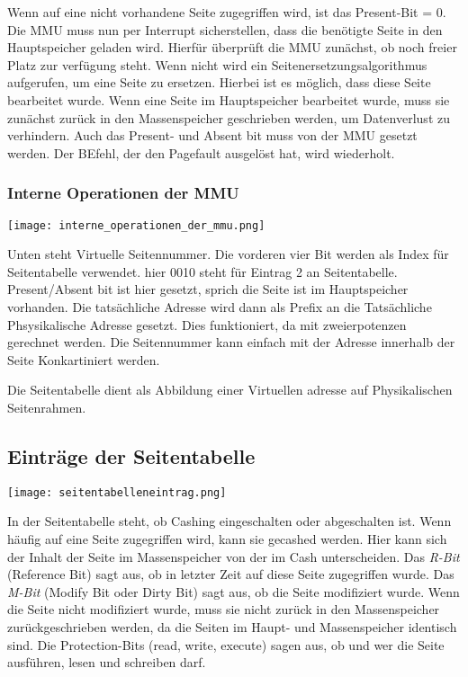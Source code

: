 Wenn auf eine nicht vorhandene Seite zugegriffen wird, ist das Present-Bit = 0. Die MMU muss nun per Interrupt sicherstellen, dass die benötigte Seite in den Hauptspeicher geladen wird. Hierfür überprüft die MMU zunächst, ob noch freier Platz zur verfügung steht. Wenn nicht wird ein Seitenersetz\-ungsalgorithmus aufgerufen, um eine Seite zu ersetzen. Hierbei ist es möglich, dass diese Seite bearbeitet wurde. Wenn eine Seite im Hauptspeicher bearbeitet wurde, muss sie zunächst zurück in den Massenspeicher geschrieben werden, um Datenverlust zu verhindern. Auch das Present- und Absent bit muss von der MMU gesetzt werden. Der BEfehl, der den Pagefault ausgelöst hat, wird wiederholt.

\subsubsection{Interne Operationen der MMU}

\texttt{[image: interne\_operationen\_der\_mmu.png]}

Unten steht Virtuelle Seitennummer. Die vorderen vier Bit werden als Index für Seitentabelle verwendet. hier 0010 steht für Eintrag 2 an Seitentabelle. Present/Absent bit ist hier gesetzt, sprich die Seite ist im Hauptspeicher vorhanden. Die tatsächliche Adresse wird dann als Prefix an die Tatsächliche Phsysikalische Adresse gesetzt. Dies funktioniert, da mit zweierpotenzen gerechnet werden. Die Seitennummer kann einfach mit der Adresse innerhalb der Seite Konkartiniert werden.

Die Seitentabelle dient als Abbildung einer Virtuellen adresse auf Physikalischen Seitenrahmen. 

\subsection{Einträge der Seitentabelle}

\texttt{[image: seitentabelleneintrag.png]}

In der Seitentabelle steht, ob Cashing eingeschalten oder abgeschalten ist. Wenn häufig auf eine Seite zugegriffen wird, kann sie gecashed werden. Hier kann sich der Inhalt der Seite im Massenspeicher von der im Cash unterscheiden. Das \textit{R-Bit} (Reference Bit) sagt aus, ob in letzter Zeit auf diese Seite zugegriffen wurde. Das \textit{M-Bit} (Modify Bit oder Dirty Bit) sagt aus, ob die Seite modifiziert wurde. Wenn die Seite nicht modifiziert wurde, muss sie nicht zurück in den Massenspeicher zurückgeschrieben werden, da die Seiten im Haupt- und Massenspeicher identisch sind. Die Protection-Bits (read, write, execute) sagen aus, ob und wer die Seite ausführen, lesen und schreiben darf.

